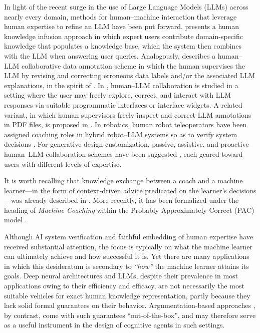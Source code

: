 \documentclass[a4paper,twoside]{article}
\begin{document}
In light of the recent surge in the use of Large Language Models (LLMs) across nearly every domain, methods for human--machine interaction that leverage human expertise to refine an LLM have been put forward. \cite{welz2024} presents a human knowledge infusion approach in which expert users contribute domain-specific knowledge that populates a knowledge base, which the system then combines with the LLM when answering user queries. Analogously, \cite{wang2024} describes a human--LLM collaborative data annotation scheme in which the human supervises the LLM by revising and correcting erroneous data labels and/or the associated LLM explanations, in the spirit of \cite{tesoKerstingIML2019}. In \cite{kim2024megannohumanllmcollaborativeannotation}, human--LLM collaboration is studied in a setting where the user may freely explore, correct, and interact with LLM responses via suitable programmatic interfaces or interface widgets. A related variant, in which human supervisors freely inspect and correct LLM annotations in PDF files, is proposed in \cite{tang2024}. In robotics, human robot teleoperators have been assigned coaching roles in hybrid robot--LLM systems so as to verify system decisions \cite{liu2023llmbasedhumanrobotcollaborationframework}. For generative design customization, passive, assistive, and proactive human--LLM collaboration schemes have been suggested \cite{WANG2025425}, each geared toward users with different levels of expertise.

It is worth recalling that knowledge exchange between a coach and a machine learner---in the form of context-driven advice predicated on the learner's decisions---was already described in \cite{mccarthyProgramsCommonSense1959}. More recently, it has been formalized under the heading of \emph{Machine Coaching} \cite{michaelAdviceTaker2017,michaelMachineCoaching2019} within the Probably Approximately Correct (PAC) model \cite{valiantPAC1984}.

Although AI system verification and faithful embedding of human expertise have received substantial attention, the focus is typically on what the machine learner can ultimately achieve and how successful it is. Yet there are many applications in which this desideratum is secondary to \emph{``how''} the machine learner attains its goals. Deep neural architectures and LLMs, despite their prevalence in most applications owing to their efficiency and efficacy, are not necessarily the most suitable vehicles for exact human knowledge representation, partly because they lack solid formal guarantees on their behavior. Argumentation-based approaches \cite{DUNG1995321,prakkenAnAbstractFrameworkFA2010}, by contrast, come with such guarantees ``out-of-the-box'', and may therefore serve as a useful instrument in the design of cognitive agents in such settings.
\end{document}
